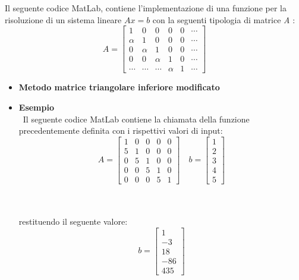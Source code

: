 Il seguente codice MatLab, contiene l'implementazione di una funzione per la risoluzione di un sistema lineare $Ax = b$ con la seguenti tipologia di matrice \textit{A} :
	\[
	A = \begin{bmatrix}
		1     		& 0      	& 0      	& 0  	 & 0 & \cdots \\ 
    	\alpha 		& 1      	& 0      	& 0  	 & 0 & \cdots \\
    	0      		& \alpha 	& 1      	& 0  	 & 0 & \cdots \\
    	0      		& 0      	& \alpha 	& 1  	 & 0 & \cdots \\
    	\cdots     	& \cdots    & \cdots    & \alpha & 1 & \cdots 
  	\end{bmatrix}
  	\]
\begin{itemize}
	\item \textbf{Metodo matrice triangolare inferiore modificato}
		
	\item \textbf{Esempio}\\\
		Il seguente codice MatLab contiene la chiamata della funzione precedentemente definita con i rispettivi valori di input:
		\[
		A = \begin{bmatrix}
			1 & 0 & 0 & 0 & 0 \\
			5 & 1 & 0 & 0 & 0 \\
			0 & 5 & 1 & 0 & 0 \\
			0 & 0 & 5 & 1 & 0 \\
			0 & 0 & 0 & 5 & 1
		\end{bmatrix} \quad
		b = \begin{bmatrix}
			1 \\
 			2 \\
 	 		3 \\
	  		4 \\
  			5
  		\end{bmatrix} 
  		\]\\\
  		
  		restituendo il seguente valore:
  		\[
  		b = \begin{bmatrix}
  			1   \\
  			-3  \\
  			18  \\
  			-86 \\
  			435
  		\end{bmatrix} 
  		\]
\end{itemize}